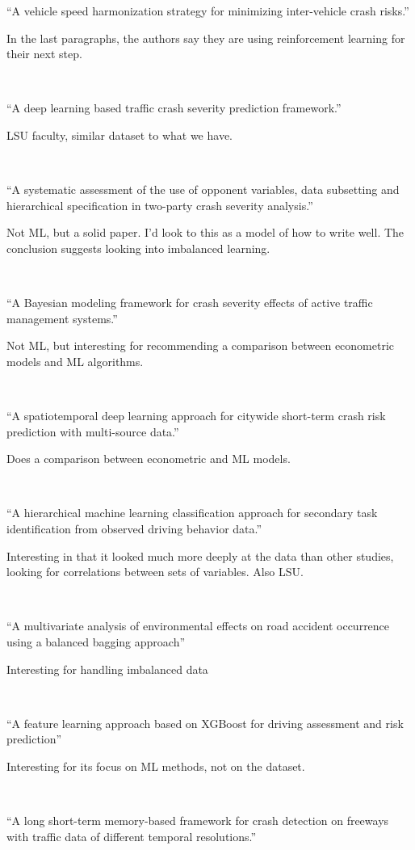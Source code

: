 \documentclass[11pt]{article}
\begin{document}
\begin{spacing}{1.2}
``A vehicle speed harmonization strategy for minimizing inter-vehicle crash risks.''

In the last paragraphs, the authors say they are using reinforcement learning for their next step. 

\

``A deep learning based traffic crash severity prediction framework.''

LSU faculty, similar dataset to what we have.  

\

``A systematic assessment of the use of opponent variables, data subsetting and hierarchical specification in two-party crash severity analysis.''

Not ML, but a solid paper.  I'd look to this as a model of how to write well.  The conclusion suggests looking into imbalanced learning.

\


``A Bayesian modeling framework for crash severity effects of active traffic management systems.''

Not ML, but interesting for recommending a comparison between econometric models and ML algorithms.  

\

``A spatiotemporal deep learning approach for citywide short-term crash risk prediction with multi-source data.''

Does a comparison between econometric and ML models.

\

``A hierarchical machine learning classification approach for secondary task identification from observed driving behavior data.''

Interesting in that it looked much more deeply at the data than other studies, looking for correlations between sets of variables.  Also LSU.

\

``A multivariate analysis of environmental effects on road accident occurrence using a balanced bagging approach''

Interesting for handling imbalanced data

\

``A feature learning approach based on XGBoost for driving assessment and risk prediction''

Interesting for its focus on ML methods, not on the dataset.  

\

``A long short-term memory-based framework for crash detection on freeways with traffic data of different temporal resolutions.''


\end{spacing}
\end{document}
